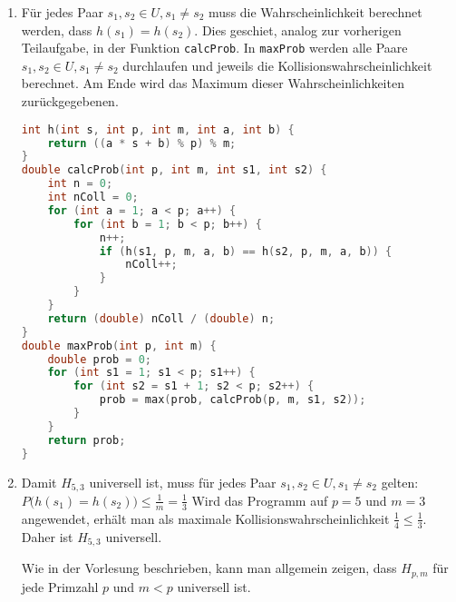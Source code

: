 \documentclass[11pt,a4paper]{article}
\begin{document}
\begin{loesung}
\begin{enumerate}
        \item 
        Für jedes Paar $s_1, s_2 \in U, s_1 \neq s_2$ muss die Wahrscheinlichkeit berechnet werden, dass $h(s_1) = h(s_2)$.
        Dies geschiet, analog zur vorherigen Teilaufgabe, in der Funktion \texttt{calcProb}.
        In \texttt{maxProb} werden alle Paare $s_1, s_2 \in U, s_1 \neq s_2$ durchlaufen und jeweils die Kollisionswahrscheinlichkeit berechnet.
        Am Ende wird das Maximum dieser Wahrscheinlichkeiten zurückgegebenen.
        \begin{lstlisting}[language=c++]
int h(int s, int p, int m, int a, int b) {
    return ((a * s + b) % p) % m;
}
double calcProb(int p, int m, int s1, int s2) {
    int n = 0;
    int nColl = 0;
    for (int a = 1; a < p; a++) {
        for (int b = 1; b < p; b++) {
            n++;
            if (h(s1, p, m, a, b) == h(s2, p, m, a, b)) {
                nColl++;
            }
        }
    }
    return (double) nColl / (double) n;
}
double maxProb(int p, int m) {
    double prob = 0;
    for (int s1 = 1; s1 < p; s1++) {
        for (int s2 = s1 + 1; s2 < p; s2++) {
            prob = max(prob, calcProb(p, m, s1, s2));
        }
    }
    return prob;
}
        \end{lstlisting}
        \item 
        Damit $H_{5, 3}$ universell ist, muss für jedes Paar $s_1, s_2 \in U, s_1 \neq s_2$ gelten: $P\big(h(s_1) = h(s_2)\big) \leq \frac{1}{m} = \frac{1}{3}$
        Wird das Programm auf $p = 5$ und $m = 3$ angewendet, erhält man als maximale Kollisionswahrscheinlichkeit $\frac{1}{4} \leq \frac{1}{3}$.
        Daher ist $H_{5, 3}$ universell.

        Wie in der Vorlesung beschrieben, kann man allgemein zeigen, dass $H_{p, m}$ für jede Primzahl $p$ und $m < p$ universell ist.
    \end{enumerate}
\end{loesung}
\end{document}
